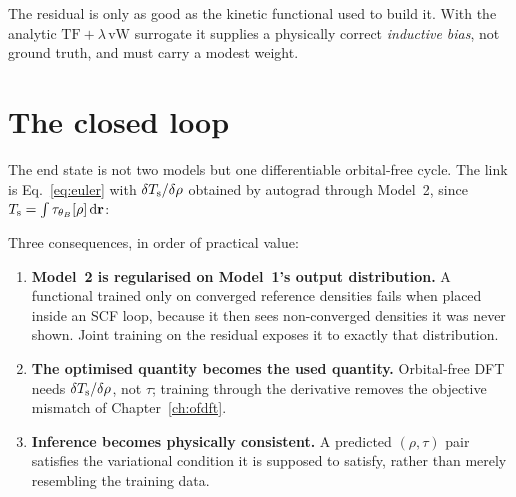 \begin{pwarn}
The residual is only as good as the kinetic functional used to build it. With
the analytic $\mathrm{TF}+\lambda\,\mathrm{vW}$ surrogate it supplies a
physically correct \emph{inductive bias}, not ground truth, and must carry a
modest weight.
\end{pwarn}

\section{The closed loop}

The end state is not two models but one differentiable orbital-free cycle. The
link is Eq.~\eqref{eq:euler} with $\delta T_{\mathrm{s}}/\delta\rho$ obtained by autograd
through Model~2, since $T_{\mathrm{s}}=\int\tau_{\theta_B}[\rho]\,\mathrm{d}\mathbf{r}$:

\begin{center}
\end{center}

Three consequences, in order of practical value:

\begin{enumerate}
  \item \textbf{Model~2 is regularised on Model~1's output distribution.} A
    functional trained only on converged reference densities fails when placed
    inside an SCF loop, because it then sees non-converged densities it was
    never shown. Joint training on the residual exposes it to exactly that
    distribution.
  \item \textbf{The optimised quantity becomes the used quantity.} Orbital-free
    DFT needs $\delta T_{\mathrm{s}}/\delta\rho$, not $\tau$; training through the
    derivative removes the objective mismatch of Chapter~\ref{ch:ofdft}.
  \item \textbf{Inference becomes physically consistent.} A predicted
    $(\rho,\tau)$ pair satisfies the variational condition it is supposed to
    satisfy, rather than merely resembling the training data.
\end{enumerate}

